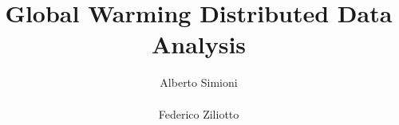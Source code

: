 \documentclass{vldb}
\begin{document}

\title{Global Warming Distributed Data Analysis}



%
%
%
%


\author{
%
%
\alignauthor Alberto Simioni\\
       \\
\alignauthor Federico Ziliotto\\
       \\
}
\date{}
\end{document}
